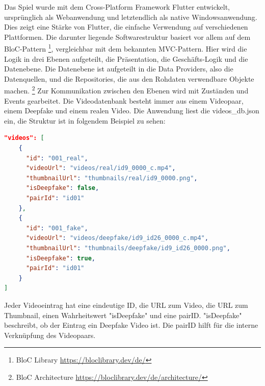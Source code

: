 Das Spiel wurde mit dem Cross-Platform Framework Flutter entwickelt, ursprünglich als Webanwendung und letztendlich als native Windowsanwendung. 
Dies zeigt eine Stärke von Flutter, die einfache Verwendung auf verschiedenen Plattformen.
Die darunter liegende Softwarestruktur basiert vor allem auf dem BloC-Pattern \footnote{
    BloC Library
    \url{https://bloclibrary.dev/de/}
}, vergleichbar mit dem bekannten MVC-Pattern. 
Hier wird die Logik in drei Ebenen aufgeteilt, die Präsentation, die Geschäfts-Logik und die Datenebene. 
Die Datenebene ist aufgeteilt in die Data Providers, also die Datenquellen, und die Repositories, die aus den Rohdaten verwendbare Objekte machen. \footnote{
    BloC Architecture
    \url{https://bloclibrary.dev/de/architecture/}
}
Zur Kommunikation zwischen den Ebenen wird mit Zuständen und Events gearbeitet.
Die Videodatenbank besteht immer aus einem Videopaar, einem  Deepfake und einem realen Video. Die Anwendung liest die videos\_db.json ein, die Struktur ist in folgendem Beispiel zu sehen: 

\begin{lstlisting}[language=json, caption=Video-Datenstruktur]
"videos": [
    {
      "id": "001_real",
      "videoUrl": "videos/real/id9_0000_c.mp4",
      "thumbnailUrl": "thumbnails/real/id9_0000.png",
      "isDeepfake": false,
      "pairId": "id01"
    },
    {
      "id": "001_fake",
      "videoUrl": "videos/deepfake/id9_id26_0000_c.mp4",
      "thumbnailUrl": "thumbnails/deepfake/id9_id26_0000.png",
      "isDeepfake": true,
      "pairId": "id01"      
    }
]
\end{lstlisting}

Jeder Videoeintrag hat eine eindeutige ID, die URL zum Video, die URL zum Thumbnail, einen Wahrheitswert "isDeepfake" und eine pairID. 
"isDeepfake" beschreibt, ob der Eintrag ein Deepfake Video ist. Die pairID hilft für die interne Verknüpfung des Videopaars.

